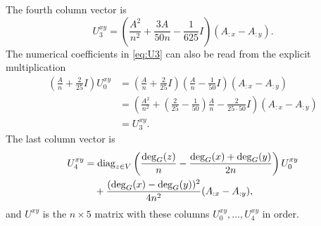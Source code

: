 \documentclass[11pt]{article}
\begin{document}
The fourth column vector is
\begin{equation}\label{eq:U3}
U_3^{xy}=\left(\frac{A^2}{n^2}+\frac{3A}{50n}-\frac1{625}I\right)(A_{:x}-A_{:y}).
\end{equation}
The numerical coefficients in \eqref{eq:U3} can also be read from the explicit multiplication
\begin{align*}
\left(\frac An+\frac2{25}I\right)U_0^{xy}
&=\left(\frac An+\frac2{25}I\right)
\left(\frac An-\frac1{50}I\right)(A_{:x}-A_{:y})\\
&=\left(\frac{A^2}{n^2}
+\left(\frac2{25}-\frac1{50}\right)\frac An
-\frac2{25\cdot50}I\right)(A_{:x}-A_{:y})\\
&=U_3^{xy}.
\end{align*}
The last column vector is
\begin{align}
U_4^{xy}
&=\operatorname{diag}_{z\in V}\left(
\frac{\deg_G(z)}n-\frac{\deg_G(x)+\deg_G(y)}{2n}\right)U_0^{xy}\notag\\
&\quad+\frac{(\deg_G(x)-\deg_G(y))^2}{4n^2}(A_{:x}-A_{:y}),
\label{eq:U4}
\end{align}
and $U^{xy}$ is the $n\times5$ matrix with these columns $U_0^{xy},\ldots,U_4^{xy}$ in order.
\end{document}
